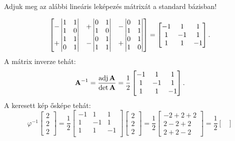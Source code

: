 \documentclass[exercise]{math-standalone}
\begin{document}
\begin{exercise}{%
    Adjuk meg az alábbi lineáris leképezés mátrixát a standard bázisban!
  }
{\begin{enumerate}[a)]
\begin{enumerate}[1)]
\[\begin{bmatrix}
                        -\begin{vmatrix}1&1\\1&0\end{vmatrix} & +\begin{vmatrix}0&1\\1&0\end{vmatrix} & -\begin{vmatrix}0&1\\1&1\end{vmatrix} \\
                        +\begin{vmatrix}1&1\\0&1\end{vmatrix} & -\begin{vmatrix}0&1\\1&1\end{vmatrix} & +\begin{vmatrix}0&1\\1&0\end{vmatrix} \\
                      \end{bmatrix} = \begin{bmatrix}
                        -1 & 1  & 1  \\
                        1  & -1 & 1  \\
                        1  & 1  & -1 \\
                      \end{bmatrix}
                      \text.
                    \]
                    A mátrix inverze tehát:
                    \[
                      \mathbf{A}^{-1}
                      = \frac{\operatorname{adj} \mathbf{A}}{\det \mathbf{A}}
                      = \frac{1}{2} \begin{bmatrix}
                        -1 & 1  & 1  \\
                        1  & -1 & 1  \\
                        1  & 1  & -1 \\
                      \end{bmatrix}
                      \text.
                    \]
                    A keresett kép ősképe tehát:
                    \[
                      \varphi^{-1} \begin{bmatrix}
                        2 \\ 2 \\ 2
                      \end{bmatrix} = \frac{1}{2} \begin{bmatrix}
                        -1 & 1  & 1  \\
                        1  & -1 & 1  \\
                        1  & 1  & -1 \\
                      \end{bmatrix} \begin{bmatrix}
                        2 \\ 2 \\ 2
                      \end{bmatrix} = \frac{1}{2} \begin{bmatrix}
                        -2 + 2 + 2 \\ 2 - 2 + 2 \\ 2 + 2 - 2
                      \end{bmatrix} = \frac{1}{2} \begin{bmatrix}

\end{bmatrix}\]
\end{enumerate}
\end{enumerate}}
\end{exercise}
\end{document}
